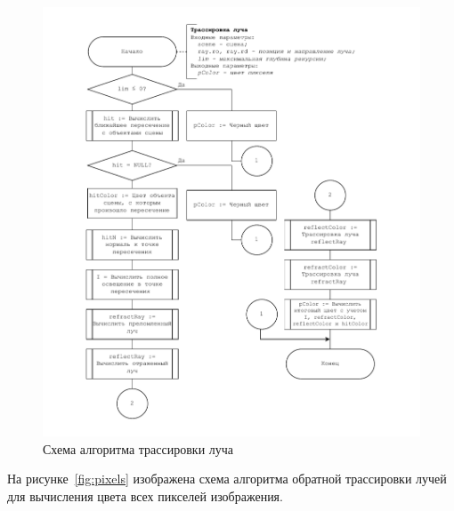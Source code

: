 \newpage
\begin{figure}[ht!]
	\begin{center}
		\includegraphics[scale=0.9]{diag/main-raytracing-pixel.pdf}
	\end{center}
	\caption{Схема алгоритма трассировки луча}
	\label{fig:pixel}
\end{figure}

На рисунке~\ref{fig:pixels} изображена схема алгоритма обратной трассировки лучей для вычисления цвета всех пикселей изображения.

